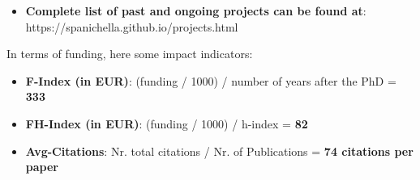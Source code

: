 \documentclass[11pt]{article}
\begin{document}
\begin{itemize}
\textbf{Total of the two internal projects 24,000 CHF (working hours allocated to it), Sebastiano Panichella got direct funding for around 17,000 CHF}
\vspace{-2.5mm}
  \item \textbf{Complete list of past and ongoing projects can be found at}:  https://spanichella.github.io/projects.html
\vspace{-3.5mm}
\end{itemize}


In terms of funding, here some impact indicators:
\begin{itemize}
  \item \textbf{F-Index (in EUR)}: (funding / 1000) / number of years after the PhD = \textbf{333}
  \item \textbf{FH-Index (in EUR)}: (funding / 1000) / h-index = \textbf{82}
  \item \textbf{Avg-Citations}: Nr. total citations / Nr. of Publications = \textbf{74 citations per paper}
\end{itemize}
\end{document}
